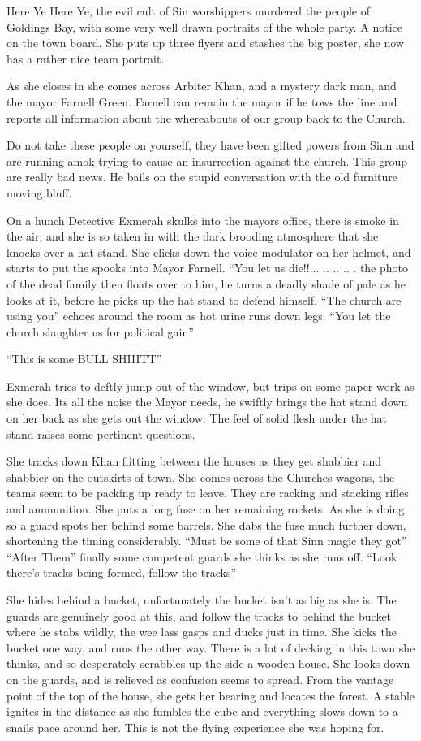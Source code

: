 Here Ye Here Ye, the evil cult of Sin worshippers murdered the people of Goldings Bay, with some very well drawn portraits of the whole party. A notice on the town board. She puts up three flyers and stashes the big poster, she now has a rather nice team portrait.\medskip

As she closes in she comes across Arbiter Khan, and a mystery dark man, and the mayor Farnell Green. Farnell can remain the mayor if he tows the line and reports all information about the whereabouts of our group back to the Church.\medskip

Do not take these people on yourself, they have been gifted powers from Sinn and are running amok trying to cause an insurrection against the church. This group are really bad news. He bails on the stupid conversation with the old furniture moving bluff.\medskip

On a hunch Detective Exmerah skulks into the mayors office, there is smoke in the air, and she is so taken in with the dark brooding atmosphere that she knocks over a hat stand. She clicks down the voice modulator on her helmet, and starts to put the spooks into Mayor Farnell. “You let us die!!... .. .. .. . the photo of the dead family then floats over to him, he turns a deadly shade of pale as he looks at it, before he picks up the hat stand to defend himself. “The church are using you” echoes around the room as hot urine runs down legs. “You let the church slaughter us for political gain”\medskip

“This is some BULL SHIIITT”\medskip

Exmerah tries to deftly jump out of the window, but trips on some paper work as she does. Its all the noise the Mayor needs, he swiftly brings the hat stand down on her back as she gets out the window. The feel of solid flesh under the hat stand raises some pertinent questions.\medskip

She tracks down Khan flitting between the houses as they get shabbier and shabbier on the outskirts of town. She comes across the Churches wagons, the teams seem to be packing up ready to leave. They are racking and stacking rifles and ammunition. She puts a long fuse on her remaining rockets. As she is doing so a guard spots her behind some barrels. She dabs the fuse much further down, shortening the timing considerably. “Must be some of that Sinn magic they got” “After Them” finally some competent guards she thinks as she runs off. “Look there’s tracks being formed, follow the tracks”\medskip

She hides behind a bucket, unfortunately the bucket isn’t as big as she is. The guards are genuinely good at this, and follow the tracks to behind the bucket where he stabs wildly, the wee lass gasps and ducks just in time. She kicks the bucket one way, and runs the other way. There is a lot of decking in this town she thinks, and so desperately scrabbles up the side a wooden house. She looks down on the guards, and is relieved as confusion seems to spread. From the vantage point of the top of the house, she gets her bearing and locates the forest. A stable ignites in the distance as she fumbles the cube and everything slows down to a snails pace around her. This is not the flying experience she was hoping for.\medskip

